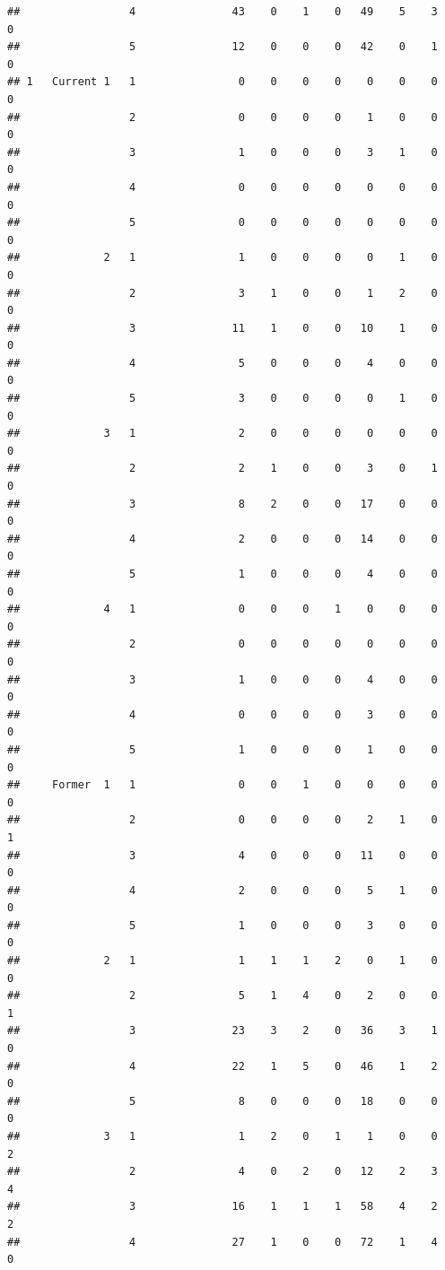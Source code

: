 \documentclass{article}\usepackage[]{graphicx}\usepackage[]{xcolor}
\makeatletter
\newenvironment{kframe}{%
 \def\at@end@of@kframe{}%
 \ifinner\ifhmode%
  \def\at@end@of@kframe{\end{minipage}}%
  \begin{minipage}{\columnwidth}%
 \fi\fi%
 \def\FrameCommand##1{\hskip\@totalleftmargin \hskip-\fboxsep
 \colorbox{shadecolor}{##1}\hskip-\fboxsep
     \hskip-\linewidth \hskip-\@totalleftmargin \hskip\columnwidth}%
 \MakeFramed {\advance\hsize-\width
   \@totalleftmargin\z@ \linewidth\hsize
   \@setminipage}}%
 {\par\unskip\endMakeFramed%
 \at@end@of@kframe}
\newenvironment{knitrout}{}{} %
\makeatother
\begin{document}
\begin{knitrout}
\begin{kframe}
\begin{verbatim}
##                 4               43    0    1    0   49    5    3    0
##                 5               12    0    0    0   42    0    1    0
## 1   Current 1   1                0    0    0    0    0    0    0    0
##                 2                0    0    0    0    1    0    0    0
##                 3                1    0    0    0    3    1    0    0
##                 4                0    0    0    0    0    0    0    0
##                 5                0    0    0    0    0    0    0    0
##             2   1                1    0    0    0    0    1    0    0
##                 2                3    1    0    0    1    2    0    0
##                 3               11    1    0    0   10    1    0    0
##                 4                5    0    0    0    4    0    0    0
##                 5                3    0    0    0    0    1    0    0
##             3   1                2    0    0    0    0    0    0    0
##                 2                2    1    0    0    3    0    1    0
##                 3                8    2    0    0   17    0    0    0
##                 4                2    0    0    0   14    0    0    0
##                 5                1    0    0    0    4    0    0    0
##             4   1                0    0    0    1    0    0    0    0
##                 2                0    0    0    0    0    0    0    0
##                 3                1    0    0    0    4    0    0    0
##                 4                0    0    0    0    3    0    0    0
##                 5                1    0    0    0    1    0    0    0
##     Former  1   1                0    0    1    0    0    0    0    0
##                 2                0    0    0    0    2    1    0    1
##                 3                4    0    0    0   11    0    0    0
##                 4                2    0    0    0    5    1    0    0
##                 5                1    0    0    0    3    0    0    0
##             2   1                1    1    1    2    0    1    0    0
##                 2                5    1    4    0    2    0    0    1
##                 3               23    3    2    0   36    3    1    0
##                 4               22    1    5    0   46    1    2    0
##                 5                8    0    0    0   18    0    0    0
##             3   1                1    2    0    1    1    0    0    2
##                 2                4    0    2    0   12    2    3    4
##                 3               16    1    1    1   58    4    2    2
##                 4               27    1    0    0   72    1    4    0

\end{verbatim}
\end{kframe}
\end{knitrout}
\end{document}
